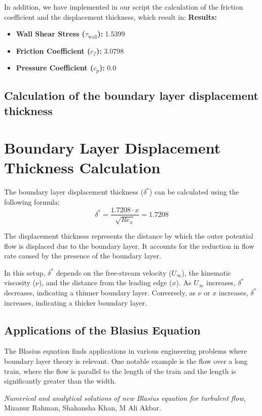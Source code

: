\documentclass{article}
\begin{document}
In addition, we have implemented in our script the calculation of the friction coefficient and the displacement thickness, which result in:
\textbf{Results:}
\begin{itemize}
    \item \textbf{Wall Shear Stress (\(\tau_{\text{wall}}\)):} 1.5399
    \item \textbf{Friction Coefficient (\(c_f\)):} 3.0798
    \item \textbf{Pressure Coefficient (\(c_p\)):} 0.0
\end{itemize}

\subsection{Calculation of the boundary layer displacement thickness}
\section*{Boundary Layer Displacement Thickness Calculation}
The boundary layer displacement thickness (\(\delta^*\)) can be calculated using the following formula:
\[
\delta^* = \frac{1.7208 \cdot x}{\sqrt{Re_x}} = 1.7208
\]

The displacement thickness represents the distance by which the outer potential flow is displaced due to the boundary layer. It accounts for the reduction in flow rate caused by the presence of the boundary layer.

In this setup, \(\delta^*\) depends on the free-stream velocity (\(U_\infty\)), the kinematic viscosity (\(\nu\)), and the distance from the leading edge (\(x\)). As \(U_\infty\) increases, \(\delta^*\) decreases, indicating a thinner boundary layer. Conversely, as \(\nu\) or \(x\) increases, \(\delta^*\) increases, indicating a thicker boundary layer.
\subsection{Applications of the Blasius Equation}
The Blasius equation finds applications in various engineering problems where boundary layer theory is relevant. One notable example is the flow over a long train, where the flow is parallel to the length of the train and the length is significantly greater than the width. 


\begin{thebibliography}{9}

  \textit{Numerical and analytical solutions of new Blasius equation for turbulent flow},
  Mizanur Rahman, Shahansha Khan, M Ali Akbar.
\end{thebibliography}
\end{document}
